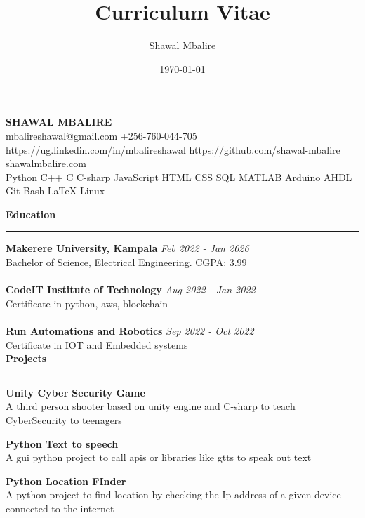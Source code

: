\documentclass[a4paper]{article}
\title{Curriculum Vitae}
\author{Shawal Mbalire}
\date{\today}
\begin{document}
    \begin{center}
        \LARGE{\bf SHAWAL MBALIRE} \\
        {\small
        mbalireshawal@gmail.com
        +256-760-044-705
        https://ug.linkedin.com/in/mbalireshawal
        https://github.com/shawal-mbalire
        shawalmbalire.com\\
        Python C++ C  C-sharp JavaScript
        HTML CSS SQL MATLAB
        Arduino AHDL Git Bash LaTeX Linux}
    \end{center}

    \begin{minipage}[t]{0.5\textwidth}

        {\Large\bf Education}
        \hrule
        {\bf Makerere University, Kampala}
        \hfil{\em Feb 2022 - Jan 2026}\\
        Bachelor of Science, Electrical Engineering.
        \hfil CGPA: 3.99\\\\
        {\bf CodeIT Institute of Technology}
        \hfil{\em Aug 2022 - Jan 2022}\\
        Certificate in python, aws, blockchain\\\\
        {\bf Run Automations and Robotics}
        \hfil{\em Sep 2022 - Oct 2022}\\
        Certificate in IOT and Embedded systems\\


        {\Large\bf Projects}
        \hrule

        {\bf Unity Cyber Security Game}\\
        A third person shooter based on unity engine and C-sharp to teach CyberSecurity to teenagers

        {\bf Python Text to speech}\\
        A gui python project to call apis or libraries like gtts to speak out text

        {\bf Python Location FInder}\\
        A python project to find location by checking the Ip address of a given device connected to the internet


\end{minipage}
\end{document}
